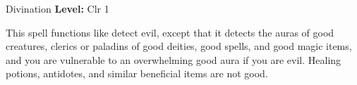 {Divination}
{
	\textbf{Level:}
	Clr 1\\
}
{
	This spell functions like detect evil, except that it detects the auras of good creatures, clerics or paladins of good deities, good spells, and good magic items, and you are vulnerable to an overwhelming good aura if you are evil. Healing potions, antidotes, and similar beneficial items are not good.

}
